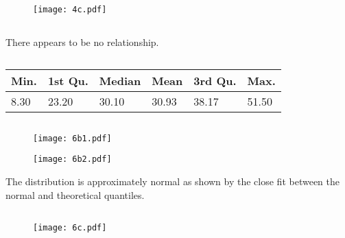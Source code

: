 \documentclass[twocolumn]{article}
\begin{document}
\subsection{}
\vspace{-7pt}
\begin{figure}[!ht]
\centering
\texttt{[image: 4c.pdf]}
\end{figure}


\subsection{}
There appears to be no relationship.


\subsection{}
\vspace{-1em}
\begin{table}[h]
\centering
\begin{tabular}{@{}llllll@{}}
\toprule
Min. & 1st Qu. & Median & Mean  & 3rd Qu. & Max.  \\ \midrule
8.30 & 23.20   & 30.10  & 30.93 & 38.17   & 51.50  \\ \bottomrule
\end{tabular}
\end{table}

\subsection{}
\begin{figure}[!ht]
\centering
\texttt{[image: 6b1.pdf]}
\end{figure}
\begin{figure}[!ht]
\centering
\texttt{[image: 6b2.pdf]}
\end{figure}

The distribution is approximately normal as shown by the close fit between the normal and theoretical quantiles.

\subsection{}
\begin{figure}[h]
\centering
\texttt{[image: 6c.pdf]}
\end{figure}
\end{document}
